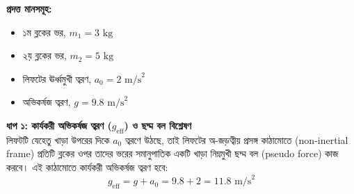 \documentclass[12pt, a4paper]{article}
\begin{document}
\begin{tcolorbox}[solutionbox={সমাধান (Solution)}]
\noindent
\textbf{প্রদত্ত মানসমূহ:}
\begin{itemize}[leftmargin=*, parsep=0.3ex]
    \item ১ম ব্লকের ভর, $m_1 = 3\text{ kg}$
    \item ২য় ব্লকের ভর, $m_2 = 5\text{ kg}$
    \item লিফটের ঊর্ধ্বমুখী ত্বরণ, $a_0 = 2\text{ m/s}^2$
    \item অভিকর্ষজ ত্বরণ, $g = 9.8\text{ m/s}^2$
\end{itemize}

\vspace{0.5em}
\noindent
\textbf{ধাপ ১: কার্যকরী অভিকর্ষজ ত্বরণ ($g_{\text{eff}}$) ও ছদ্ম বল বিশ্লেষণ} \\
লিফটটি যেহেতু খাড়া উপরের দিকে $a_0$ ত্বরণে উঠছে, তাই লিফটের অ-জড়ত্বীয় প্রসঙ্গ কাঠামোতে (non-inertial frame) প্রতিটি ব্লকের ওপর তাদের ভরের সমানুপাতিক একটি খাড়া নিম্নমুখী ছদ্ম বল (pseudo force) কাজ করবে। 
এই কাঠামোতে কার্যকরী অভিকর্ষজ ত্বরণ হবে:
$$g_{\text{eff}} = g + a_0 = 9.8 + 2 = 11.8\text{ m/s}^2$$

\vspace{1em}
\begin{center}
\end{center}
\end{tcolorbox}
\end{document}
